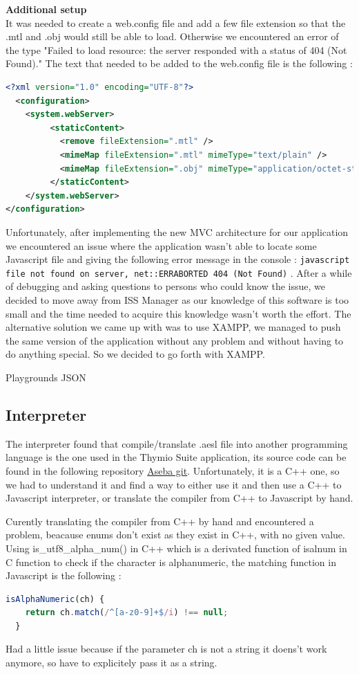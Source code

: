 \documentclass{scrartcl}
\begin{document}
\textbf{Additional setup}\\

It was needed to create a web.config file and add a few file extension so that the .mtl and .obj would still be able to load. 
Otherwise we encountered an error of the type "Failed to load resource: the server responded with a status of 404 (Not Found)." 
The text that needed to be added to the web.config file is the following : \\
\begin{lstlisting}[language=XML, basicstyle=\ttfamily\small]
<?xml version="1.0" encoding="UTF-8"?>
  <configuration>
    <system.webServer>
         <staticContent>
           <remove fileExtension=".mtl" />
           <mimeMap fileExtension=".mtl" mimeType="text/plain" />
           <mimeMap fileExtension=".obj" mimeType="application/octet-stream" />
         </staticContent>
    </system.webServer>
</configuration>
\end{lstlisting}

Unfortunately, after implementing the new MVC architecture for our application we encountered an issue where the application wasn't able to locate some Javascript file and giving the following error message in the console : 
\texttt{javascript file not found on server, net::ERR\textunderscore ABORTED 404 (Not Found)} .  After a while of debugging and asking questions to persons who could know the issue, 
we decided to move away from ISS Manager as our knowledge of this software is too small and the time needed to acquire this knowledge wasn't worth the effort. 
The alternative solution we came up with was to use XAMPP, we managed to push the same version of the application without any problem and without having to do anything special. So we decided to go forth with XAMPP.

Playgrounds 
JSON
\subsection{Interpreter}
The interpreter found that compile/translate .aesl file into another programming language is the one used in the Thymio Suite application, its source code can be found in the following repository \href{https://github.com/aseba-community/aseba/tree/master/aseba/compiler}{Aseba git}.
Unfortunately, it is a C++ one, so we had to understand it and find a way to either use it and then use a C++ to Javascript interpreter, or translate the compiler from C++ to Javascript by hand.

Curently translating the compiler from C++ by hand and encountered a problem, beacause enums don't exist as they exist in C++, with no given value.
Using is_utf8_alpha_num() in C++ which is a derivated function of isalnum in C function to check if the character is alphanumeric, the matching function in Javascript is the following :
\begin{lstlisting}[language=JavaScript, basicstyle=\ttfamily\small]
  isAlphaNumeric(ch) {
    return ch.match(/^[a-z0-9]+$/i) !== null;
  }
\end{lstlisting}
Had a little issue because if the parameter ch is not a string it doens't work anymore, so have to explicitely pass it as a string.
\end{document}
